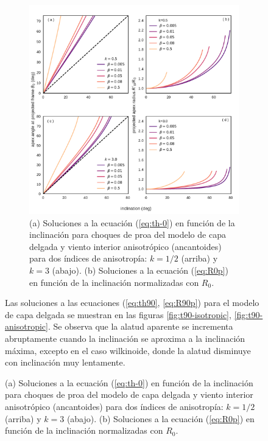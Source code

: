 \begin{figure}
\begin{figure}
  \includegraphics[width=\linewidth]{./Figures/ancantoid-th0-vs-i}
  \caption{(a) Soluciones a la ecuación (\ref{eq:th-0}) en función de la inclinación para choques de proa del modelo de capa delgada y viento interior anisotrópico (ancantoides) para dos índices de anisotropía: $k=1/2$ (arriba) y $k=3$ (abajo). (b) Soluciones a la ecuación (\ref{eq:R0p}) en función de la inclinación normalizadas con $R_0$.}
  \label{fig:th0-anisotropic}
\end{figure}

Las soluciones a las ecuaciones (\ref{eq:th90}, \ref{eq:R90p}) para el modelo de capa delgada se muestran en las figuras \ref{fig:t90-isotropic}, \ref{fig:t90-anisotropic}. Se observa que la alatud aparente se incrementa abruptamente cuando la inclinación se aproxima a la inclinación máxima, excepto en el caso wilkinoide, donde la alatud disminuye con inclinación muy lentamente.


\end{figure}
